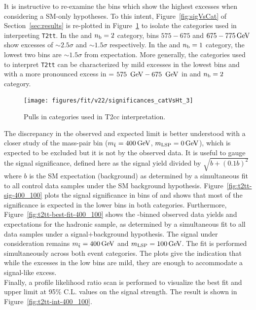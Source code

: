 \FloatBarrier

It is instructive to re-examine the \scalht bins which show the highest excesses 
when considering a SM-only hypotheses. To this intent, Figure~\ref{fig:sigVsCat} of 
Section~\ref{sec:results} is re-plotted in Figure~\ref{fig:sigVsCat2} to 
isolate the categories used in interpreting \texttt{T2tt}. In the \njethigh 
and $n_{\text{b}} = 2$ category, \scalht bins $575-675$ and $675-775\,\text{Ge\hspace{-.08em}V}$ show excesses of 
$\sim\!\!2.5\sigma$ and $\sim\!\!1.5\sigma$ respectively. In the \njethigh and 
$n_{\text{b}} = 1$ category, the lowest two \scalht bins are $\sim\!\!1.5\sigma$ 
from expectation. More generally, the categories used to interpret \texttt{T2tt} can be
characterized by mild excesses in the lowest \scalht bins and with
a more pronounced excess in \scalht = $575~\,\text{Ge\hspace{-.08em}V}-675~\,\text{Ge\hspace{-.08em}V}$ in \njethigh 
and $n_{\text{b}} = 2$ category. 
\begin{figure}[h!]
  \begin{center}
      \texttt{[image: figures/fit/v22/significances\_catVsHt\_3]}
    \caption{Pulls in categories used in T2cc interpretation.\label{fig:sigVsCat2}}
  \end{center}
\end{figure}
The discrepancy in the observed and expected 
limit is better understood with a closer study of the mass-pair
bin ($m_{\tilde{\rm t}} = 400\,\text{Ge\hspace{-.08em}V}$, $m_{\text{LSP}} = 0\,\text{Ge\hspace{-.08em}V}$), which is 
expected to be excluded but it is not by the observed data. 
It is useful to gauge the signal significance, defined here as the signal 
yield divided by $\sqrt{b+(0.1b)^2}$ where $b$ is the SM expectation (background) 
as determined by a simultaneous fit to all control data samples under the SM background 
hypothesis. Figure~\ref{fig:t2tt-sig-400_100} plots the signal significance in bins of 
\scalht and shows that most of the significance is expected in the 
lower \scalht bins in both categories. Furthermore, 
Figure~\ref{fig:t2tt-best-fit-400_100} shows the \scalht-binned 
observed data yields and expectations for the hadronic sample, as determined 
by a simultaneous fit to all data samples under a signal+background 
hypothesis. The signal under consideration remains $m_{\tilde{\rm t}} = 400\,\text{Ge\hspace{-.08em}V}$ and 
$m_{\text{LSP}} = 100\,\text{Ge\hspace{-.08em}V}$. The fit is performed simultaneously across 
both event categories. The plots give the indication that while the excesses 
in the low \scalht bins are mild, they are enough to accommodate a signal-like
excess.\\
\indent Finally, a profile likelihood ratio scan is performed 
to visualize the best fit and upper limit at 95\% C.L. values 
on the signal strength. The result is shown in Figure~\ref{fig:t2tt-int-400_100}.

